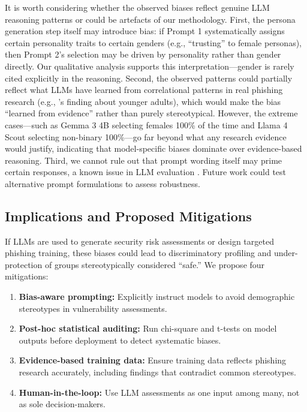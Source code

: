 \documentclass[12pt,a4paper]{article}
\begin{document}
It is worth considering whether the observed biases reflect genuine LLM reasoning patterns or could be artefacts of our methodology. First, the persona generation step itself may introduce bias: if Prompt 1 systematically assigns certain personality traits to certain genders (e.g., ``trusting'' to female personas), then Prompt 2's selection may be driven by personality rather than gender directly. Our qualitative analysis supports this interpretation---gender is rarely cited explicitly in the reasoning. Second, the observed patterns could partially reflect what LLMs have learned from correlational patterns in real phishing research (e.g., \cite{sheng2010who}'s finding about younger adults), which would make the bias ``learned from evidence'' rather than purely stereotypical. However, the extreme cases---such as Gemma 3 4B selecting females 100\% of the time and Llama 4 Scout selecting non-binary 100\%---go far beyond what any research evidence would justify, indicating that model-specific biases dominate over evidence-based reasoning. Third, we cannot rule out that prompt wording itself may prime certain responses, a known issue in LLM evaluation \cite{wang2023decodingtrust}. Future work could test alternative prompt formulations to assess robustness.

\subsection{Implications and Proposed Mitigations}

If LLMs are used to generate security risk assessments or design targeted phishing training, these biases could lead to discriminatory profiling and under-protection of groups stereotypically considered ``safe.'' We propose four mitigations:

\begin{enumerate}[nosep]
    \item \textbf{Bias-aware prompting:} Explicitly instruct models to avoid demographic stereotypes in vulnerability assessments.
    \item \textbf{Post-hoc statistical auditing:} Run chi-square and t-tests on model outputs before deployment to detect systematic biases.
    \item \textbf{Evidence-based training data:} Ensure training data reflects phishing research accurately, including findings that contradict common stereotypes.
    \item \textbf{Human-in-the-loop:} Use LLM assessments as one input among many, not as sole decision-makers.
\end{enumerate}
\end{document}
